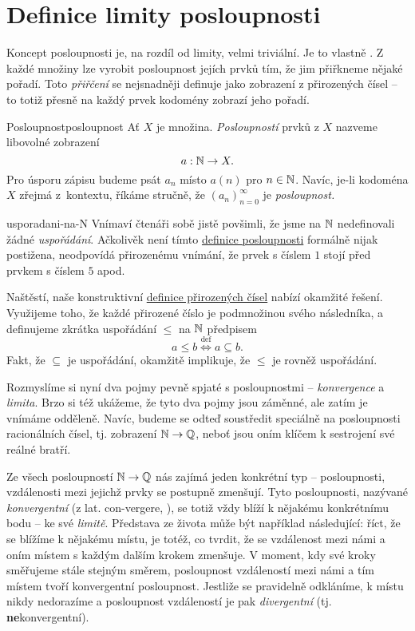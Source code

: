 \section{Definice limity posloupnosti}
\label{sec:definice-limity-posloupnosti}

Koncept posloupnosti je, na rozdíl od limity, velmi triviální. Je to vlastně
. Z každé množiny lze vyrobit posloupnost jejích
prvků tím, že jim přiřkneme nějaké pořadí. Toto \emph{přiřčení} se nejsnadněji
definuje jako zobrazení z přirozených čísel -- to totiž přesně na každý prvek
kodomény zobrazí jeho pořadí.

\begin{definition}{Posloupnost}{posloupnost}
 Ať $X$ je množina. \emph{Posloupností} prvků z $X$ nazveme libovolné zobrazení
 \[
  a:\mathbb{N} \to X.
 \]
 Pro úsporu zápisu budeme psát $a_n$ místo $a(n)$ pro $n \in \mathbb{N}$. Navíc, je-li
 kodoména $X$ zřejmá z~kontextu, říkáme stručně, že $(a_n)_{n=0}^{\infty}$ je
 \emph{posloupnost.}
\end{definition}

\begin{remark}{}{usporadani-na-N}
 Vnímaví čtenáři sobě jistě povšimli, že jsme na $\mathbb{N}$ nedefinovali žádné
 \emph{uspořádání}. Ačkolivěk není tímto \hyperref[def:posloupnost]{definice
 posloupnosti} formálně nijak postižena, neodpovídá přirozenému vnímání, že
 prvek s číslem $1$ stojí před prvkem s číslem $5$ apod.

 Naštěstí, naše konstruktivní \hyperref[def:prirozena-cisla]{definice
 přirozených čísel} nabízí okamžité řešení. Využijeme toho, že každé přirozené
 číslo je podmnožinou svého následníka, a definujeme zkrátka uspořádání $ \leq $
 na $\mathbb{N}$ předpisem
 \[
  a \leq b \overset{\text{def}}{\iff} a \subseteq b.
 \]
 Fakt, že $ \subseteq $ je uspořádání, okamžitě implikuje, že $ \leq $ je rovněž
 uspořádání.
\end{remark}

Rozmyslíme si nyní dva pojmy pevně spjaté s posloupnostmi -- \emph{konvergence}
a \emph{limita}. Brzo si též ukážeme, že tyto dva pojmy jsou záměnné, ale zatím
je vnímáme odděleně. Navíc, budeme se odteď soustředit speciálně na posloupnosti
racionálních čísel, tj. zobrazení $\mathbb{N} \to \mathbb{Q}$, neboť jsou oním klíčem k
sestrojení své reálné bratří.

Ze všech posloupností $\mathbb{N} \to \mathbb{Q}$ nás zajímá jeden konkrétní typ --
posloupnosti, vzdálenosti mezi jejichž prvky se postupně zmenšují. Tyto
posloupnosti, nazývané \emph{konvergentní} (z lat. con-vergere, ), se totiž vždy blíží k nějakému konkrétnímu bodu -- ke své \emph{limitě}.
Představa ze života může být například následující: říct, že se blížíme k
nějakému místu, je totéž, co tvrdit, že se vzdálenost mezi námi a oním místem s
každým dalším krokem zmenšuje. V moment, kdy své kroky směřujeme stále stejným
směrem, posloupnost vzdáleností mezi námi a tím místem tvoří konvergentní
posloupnost. Jestliže se pravidelně odkláníme, k místu nikdy nedorazíme a
posloupnost vzdáleností je pak \emph{divergentní} (tj.
\textbf{ne}konvergentní).

